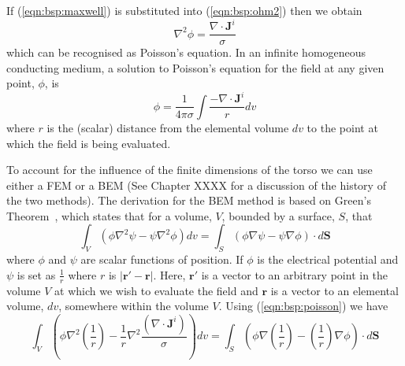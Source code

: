 If (\ref{eqn:bsp:maxwell}) is substituted into (\ref{eqn:bsp:ohm2}) then we obtain
\begin{equation}
\label{eqn:bsp:poisson}
\nabla^{2}\phi = \frac{\nabla \cdot \mathbf{J}^{i}}{\sigma}
\end{equation}
which can be recognised as Poisson's equation.
In an infinite homogeneous conducting medium, a solution to Poisson's equation
for the field at any given point, $\phi$, is~\cite{Plonsey1963}
\begin{equation}
\label{eqn:bsp:infinite}
\phi = \frac{1}{4 \pi \sigma} \int \frac{- \nabla \cdot
\mathbf{J}^{i} }{r} dv
\end{equation}
where $r$ is the (scalar) distance from the elemental volume $dv$ to the point at
which the field is being evaluated.

To account for the influence of the finite dimensions of the torso we can use
either a FEM or a BEM (See Chapter XXXX for a discussion
of the history of the two methods).
The derivation for the BEM method is based on Green's
Theorem~\cite{Barr1966,Gulranji1980,Clayton2002},
which states that for a volume, $V$, bounded by a surface, $S$, that
\begin{equation}
\label{eqn:bsp:green}
\int_{V} \left(\phi \nabla^{2}\psi - \psi \nabla^{2}\phi  \right) dv =
\int_{S} \left( \phi \nabla \psi - \psi \nabla \phi \right) \cdot d\mathbf{S}
\end{equation}
where $\phi$ and $\psi$ are scalar functions of position.
If $\phi$ is the electrical potential and $\psi$ is set as $\frac{1}{r}$ where
$r$ is $|\mathbf{r'}-\mathbf{r}|$.
Here, $\mathbf{r'}$ is a vector to an arbitrary point in the volume $V$ at which
we wish to evaluate the field and $\mathbf{r}$ is a vector to an elemental
volume, $dv$, somewhere within the volume $V$.
Using (\ref{eqn:bsp:poisson}) we have
\begin{equation}
\label{eqn:bsp:greenandpoisson}
\int_{V}
    \left(
        \phi \nabla^{2}\left(\frac{1}{r}\right) -
        \frac{1}{r} \nabla^{2}\frac{\left(\nabla \cdot \mathbf{J}^{i} \right)}{\sigma}
    \right)
dv =
\int_{S}
    \left(
        \phi \nabla \left(\frac{1}{r}\right) -
        \left(\frac{1}{r}\right) \nabla \phi
    \right)
\cdot d\mathbf{S}
\end{equation}

